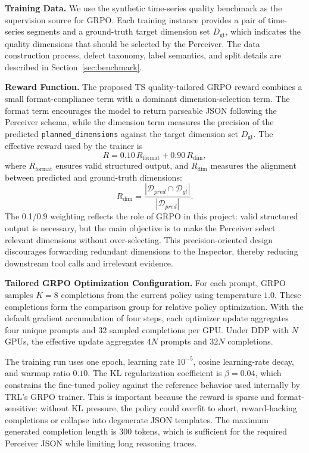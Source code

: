 \documentclass{article}
\begin{document}
\textbf{Training Data.} We use the synthetic time-series quality benchmark as the supervision source for GRPO. Each training instance provides a pair of time-series segments and a ground-truth target dimension set $D_{\mathrm{gt}}$, which indicates the quality dimensions that should be selected by the Perceiver. The data construction process, defect taxonomy, label semantics, and split details are described in Section~\ref{sec:benchmark}.

\textbf{Reward Function.} The proposed TS quality-tailored GRPO reward combines a small format-compliance term with a dominant dimension-selection term. The format term encourages the model to return parseable JSON following the Perceiver schema, while the dimension term measures the precision of the predicted \texttt{planned\_dimensions} against the target dimension set $D_{\mathrm{gt}}$. The effective reward used by the trainer is
\begin{equation}
R = 0.10\,R_{\mathrm{format}} + 0.90\,R_{\mathrm{dim}},
\end{equation}
where $R_{\text{format}}$ ensures valid structured output, and $R_{\text{dim}}$ measures the alignment between predicted and ground-truth dimensions:
\begin{equation}
R_{\text{dim}} = \frac{|\mathcal{D}_{pred} \cap \mathcal{D}_{gt}|}{|\mathcal{D}_{pred}|}.
\end{equation}
The 0.1/0.9 weighting reflects the role of GRPO in this project: valid structured output is necessary, but the main objective is to make the Perceiver select relevant dimensions without over-selecting. This precision-oriented design discourages forwarding redundant dimensions to the Inspector, thereby reducing downstream tool calls and irrelevant evidence. 

\textbf{Tailored GRPO Optimization Configuration.} For each prompt, GRPO samples $K=8$ completions from the current policy using temperature $1.0$. These completions form the comparison group for relative policy optimization. With the default gradient accumulation of four steps, each optimizer update aggregates four unique prompts and 32 sampled completions per GPU. Under DDP with $N$ GPUs, the effective update aggregates $4N$ prompts and $32N$ completions.

The training run uses one epoch, learning rate $10^{-5}$, cosine learning-rate decay, and warmup ratio $0.10$. The KL regularization coefficient is $\beta=0.04$, which constrains the fine-tuned policy against the reference behavior used internally by TRL's GRPO trainer. This is important because the reward is sparse and format-sensitive: without KL pressure, the policy could overfit to short, reward-hacking completions or collapse into degenerate JSON templates. The maximum generated completion length is 300 tokens, which is sufficient for the required Perceiver JSON while limiting long reasoning traces.
\end{document}
